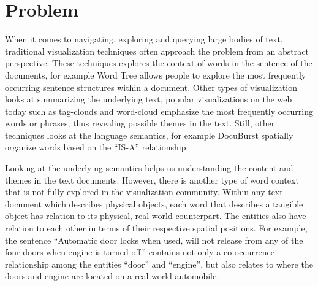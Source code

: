 

\section{Problem}
When it comes to navigating, exploring and querying large bodies of text,
traditional visualization techniques often approach the problem from an abstract
perspective. These techniques explores the context of words in the sentence of
the documents, for example Word Tree \cite{Wattenberg2008} allows people to
explore the most frequently occurring sentence structures within a document.
Other types of visualization looks at summarizing the underlying text, popular 
visualizations on the web today such as tag-clouds and word-cloud emphasize
the most frequently occurring words or phrases, thus revealing possible themes in
the text. Still, other techniques looks at the language semantics, for example 
DocuBurst \cite{COL2009a} spatially organize words based on the ``IS-A'' relationship.

Looking at the underlying semantics helps us understanding the content and 
themes in the text documents. However, there is another type of word context 
that is not fully explored in the visualization community. Within any text 
document which describes physical objects, each word that describes a 
tangible object has relation to its physical, real world counterpart. The 
entities also have relation to each other in terms of their respective 
spatial positions. For example, the sentence ``Automatic door locks when 
used, will not release from any of the four doors when engine is turned off.'' 
contains not only a co-occurrence relationship among the entities ``door'' and 
``engine'', but also relates to where the doors and engine are located on a 
real world automobile.


